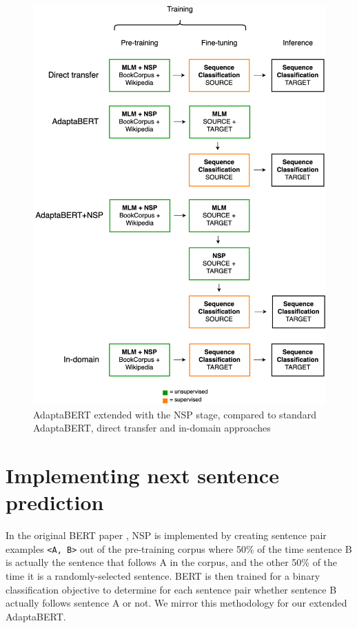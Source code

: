 \begin{figure}
    \centering
    \hspace{-1.5cm}
    \includegraphics[scale=0.28]{0-img/adaptabert-nsp.png}
    \caption{AdaptaBERT extended with the NSP stage, compared to standard AdaptaBERT, direct transfer and in-domain approaches}
    \label{fig:adaptabert-nsp}
\end{figure}

\section{Implementing next sentence prediction}

In the original BERT paper \cite{bert}, NSP is implemented by creating sentence pair examples \texttt{<A, B>} out of the pre-training corpus where 50\% of the time sentence B is actually the sentence that follows A in the corpus, and the other 50\% of the time it is a randomly-selected sentence. BERT is then trained for a binary classification objective to determine for each sentence pair whether sentence B actually follows sentence A or not. We mirror this methodology for our extended AdaptaBERT.

